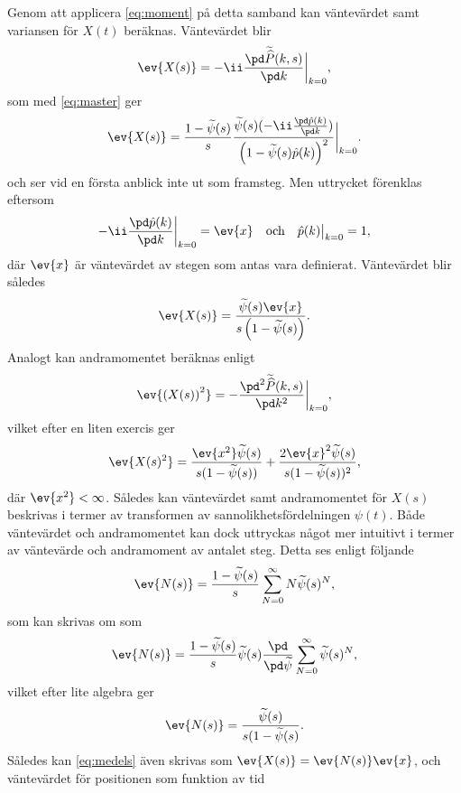 Genom att applicera \eqref{eq:moment} på detta samband kan väntevärdet samt variansen för $X(t)$ beräknas. Väntevärdet blir 
\begin{equation}
\ev{X(s)} = -\ii\frac{\pd \Pks (k,s)}{\pd k}\bigg |_{k=0},
\end{equation}
som med \eqref{eq:master} ger 
\begin{equation}
\ev{X(s)} = \frac{1-\psis (s)}{s}\frac{\psis (s)(-\ii\frac{\pd \pk (k)}{\pd k})}{\left(1-\psis (s)\pk (k)\right)^2}\bigg |_{k=0}.
\end{equation}
och ser vid en första anblick inte ut som framsteg. Men uttrycket förenklas eftersom
\begin{equation}
-\ii\frac{\pd \pk (k)}{\pd k}\bigg |_{k=0} = \ev{x}\quad\text{och}\quad\pk (k)\big |_{k=0} = 1,
\end{equation}
där $\ev{x}$ är väntevärdet av stegen som antas vara definierat.
Väntevärdet blir således 
\begin{equation}\label{eq:medels}
\ev{X(s)} = \frac{\psis (s)\ev{x}}{s\left(1-\psis (s)\right)}.
\end{equation}
Analogt kan andramomentet beräknas enligt 
\begin{equation}
\ev{\left(X(s)\right)^2} = -\frac{\pd^2 \Pks (k,s)}{\pd k^2}\bigg |_{k=0},
\end{equation}
vilket efter en liten exercis ger
\begin{equation}\label{eq:vars}
\ev{X(s)^2} = \frac{\ev{x^2}\psis (s)}{s(1-\psis (s))}+\frac{2\ev{x}^2\psis (s)}{s(1-\psis (s))^2},
\end{equation}
där $\ev{x^2}< \infty$. Således kan väntevärdet samt andramomentet för $X(s)$ beskrivas i termer av transformen av sannolikhetsfördelningen $\psi(t)$. Både väntevärdet och andramomentet kan dock uttryckas något mer intuitivt i termer av väntevärde och andramoment av antalet steg. Detta ses enligt följande 
\begin{equation}
   \ev{N(s)} = \frac{1-\psis (s)}{s}\sum_{N=0}^{\infty}N\psis (s)^N,
\end{equation}
som kan skrivas om som 
\begin{equation}
   \ev{N(s)} = \frac{1-\psis (s)}{s}\psis (s)\frac{\pd}{\pd \psis}\sum_{N=0}^{\infty}\psis (s)^N,
\end{equation}
vilket efter lite algebra ger 
\begin{equation}
   \ev{N(s)} = \frac{\psis (s)}{s(1-\psis (s)}.
\end{equation}
Således kan \eqref{eq:medels} även skrivas som $\ev{X(s)}=\ev{N(s)}\ev{x}$, och väntevärdet för positionen som funktion av tid 
